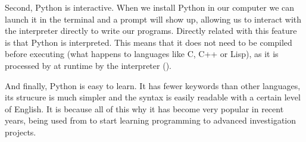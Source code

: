 Second, Python is interactive. When we install Python in our computer we can launch it in the terminal and a prompt will show up, allowing us to interact with the interpreter directly to write our programs. Directly related with this feature is that Python is interpreted. This means that it does not need to be compiled before executing (what happens to languages like C, C++ or Lisp), as it is processed by at runtime by the interpreter (\cite{python_overview}). 

And finally, Python is easy to learn. It has fewer keywords than other languages, its strucure is much simpler and the syntax is easily readable with a certain level of English. It is because all of this why it has become very popular in recent years, being used from to start learning programming to advanced investigation projects.
